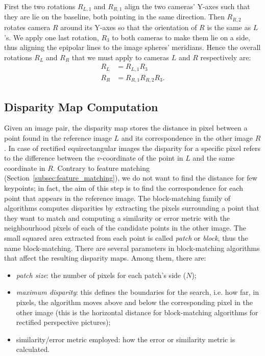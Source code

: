 %
First the two rotations $R_{L, 1}$ and $R_{R, 1}$ align the two cameras' Y-axes
such that they are lie on the baseline, both pointing in the same
direction. Then $R_{R, 2}$ rotates camera $R$ around its Y-axes so that
the orientation of $R$
is the same as $L$'s. We apply one last rotation, $R_3$ to both
cameras to make them lie on a side, thus aligning the epipolar lines to the
image spheres' meridians.
Hence the overall rotations $R_L$ and $R_R$ that we must apply to cameras $L$ and $R$
respectively are:
\begin{align}
	R_L &= R_{L, 1}R_3 \\
	R_R &= R_{R, 1}R_{R, 2}R_3	\text{.}
\end{align}

\subsection{Disparity Map Computation}
\label{subsec:disparityMap}
Given an image pair, the disparity map stores the distance in pixel between 
a point found in the reference image $L$ and its correspondence in the
other image $R$.
In case of rectified equirectangular images the disparity for a specific pixel
refers to the difference between the $v$-coordinate of the point in $L$ and the
same coordinate in $R$.
Contrary to feature matching (Section~\ref{subsec:feature_matching}), we do not
want to find the distance for few keypoints; in fact, the aim of this step is to
find the correspondence for each point that appears in the reference image.
The block-matching family of algorithms computes disparities by extracting the 
pixels surrounding a point that they want to match and computing a similarity
or error metric with the neighbourhood pixels of each of the candidate points
in the other image. The small squared area extracted from each point is called
\emph{patch} or \emph{block}, thus the name block-matching.
There are several parameters in block-matching algorithms that affect the
resulting disparity maps. Among them, there are:
\begin{itemize}
	\item \emph{patch size}: the number of pixels for each patch's side ($N$);
	\item \emph{maximum disparity}: this defines the boundaries for the search,
	i.e. how far, in pixels, the algorithm moves
	above and below the corresponding pixel in the other image (this is the
	horizontal distance for block-matching algorithms for rectified
	perspective pictures);
	\item similarity/error metric employed: how the error or similarity metric
	is calculated.
\end{itemize}

